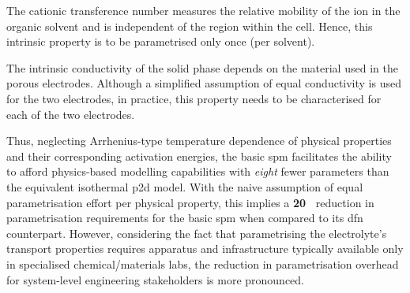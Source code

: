 \begin{enumdescriptnum}[leftmargin=!,itemsep=1ex,labelwidth=\widthof{$\symbf{\text{brugg}_j}\ \scriptstyle (\times 3)$abc}
    ,partopsep=0pt
    ,topsep=0pt
    ]
      The  cationic transference  number
    measures the relative  mobility of the  ion in  the organic solvent
    and is  independent of  the region  within the  cell. Hence,  this intrinsic
    property is to be parametrised only once (per solvent).

      The  intrinsic conductivity  of
    the  solid phase  depends on  the material  used in  the porous  electrodes.
    Although a simplified  assumption of equal conductivity is used  for the two
    electrodes, in practice, this property needs to be characterised for each of
    the two electrodes.

\end{enumdescriptnum}

   Thus,   neglecting   Arrhenius-type   temperature
dependence of  physical properties and their  corresponding activation energies,
the basic  \gls{spm} facilitates the  ability to afford  physics-based modelling
capabilities with  \emph{eight} fewer parameters than  the equivalent isothermal
\gls{p2d} model. With  the naive assumption of equal  parametrisation effort per
physical property, this  implies a \textbf{\SI{20}{\textbf{\percent}}} reduction
in  parametrisation  requirements  for  the basic  \gls{spm}  when  compared  to
its  \gls{dfn} counterpart.  However,  considering the  fact that  parametrising
the  electrolyte's transport  properties requires  apparatus and  infrastructure
typically available  only in specialised chemical/materials  labs, the reduction
in parametrisation  overhead for  system-level engineering stakeholders  is more
pronounced.

